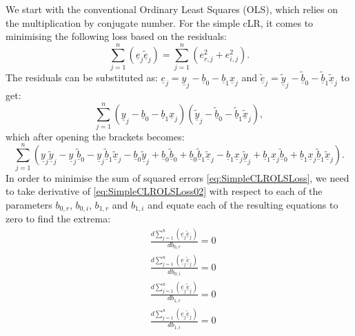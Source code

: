 \documentclass[
]{book}
\begin{document}
We start with the conventional Ordinary Least Squares (OLS), which relies on the multiplication by conjugate number. For the simple cLR, it comes to minimising the following loss based on the residuals:
\begin{equation}
    \sum_{j=1}^n (\underline{e}_j \underline{\tilde{e}}_j) = \sum_{j=1}^n (e_{r,j}^2 + e_{i,j}^2).
    \label{eq:SimpleCLROLSLoss}
\end{equation}
The residuals can be substituted as: \(\underline{e}_j = \underline{y}_j - \underline{b}_0 - \underline{b}_1 \underline{x}_j\) and \(\underline{\tilde{e}}_j = \underline{\tilde{y}}_j - \underline{\tilde{b}}_0 - \underline{\tilde{b}}_1 \underline{\tilde{x}}_j\) to get:
\begin{equation}
    \sum_{j=1}^n (\underline{y}_j - \underline{b}_0 - \underline{b}_1 \underline{x}_j) (\underline{\tilde{y}}_j - \underline{\tilde{b}}_0 - \underline{\tilde{b}}_1 \underline{\tilde{x}}_j),
    \label{eq:SimpleCLROLSLoss01}
\end{equation}
which after opening the brackets becomes:
\begin{equation}
    \sum_{j=1}^n \left(\underline{y}_j \underline{\tilde{y}}_j - \underline{y}_j \underline{\tilde{b}}_0 - \underline{y}_j \underline{\tilde{b}}_1 \underline{\tilde{x}}_j - \underline{b}_0\underline{\tilde{y}}_j + \underline{b}_0 \underline{\tilde{b}}_0 + \underline{b}_0 \underline{\tilde{b}}_1 \underline{\tilde{x}}_j - \underline{b}_1 \underline{x}_j \underline{\tilde{y}}_j + \underline{b}_1 \underline{x}_j \underline{\tilde{b}}_0 + \underline{b}_1 \underline{x}_j \underline{\tilde{b}}_1 \underline{\tilde{x}}_j \right) .
    \label{eq:SimpleCLROLSLoss02}
\end{equation}
In order to minimise the sum of squared errors \eqref{eq:SimpleCLROLSLoss}, we need to take derivative of \eqref{eq:SimpleCLROLSLoss02} with respect to each of the parameters \(b_{0,r}\), \(b_{0,i}\), \(b_{1,r}\) and \(b_{1,i}\) and equate each of the resulting equations to zero to find the extrema:
\begin{equation}
    \begin{aligned}
        & \frac{d \sum_{j=1}^n (\underline{e}_j \underline{\tilde{e}}_j)}{d b_{0,r}} = 0 \\
        & \frac{d \sum_{j=1}^n (\underline{e}_j \underline{\tilde{e}}_j)}{d b_{0,i}} = 0 \\
        & \frac{d \sum_{j=1}^n (\underline{e}_j \underline{\tilde{e}}_j)}{d b_{1,r}} = 0 \\
        & \frac{d \sum_{j=1}^n (\underline{e}_j \underline{\tilde{e}}_j)}{d b_{1,i}} = 0
    \end{aligned}
    \label{eq:SimpleCLROLSLossSystem01}
\end{equation}
\end{document}
